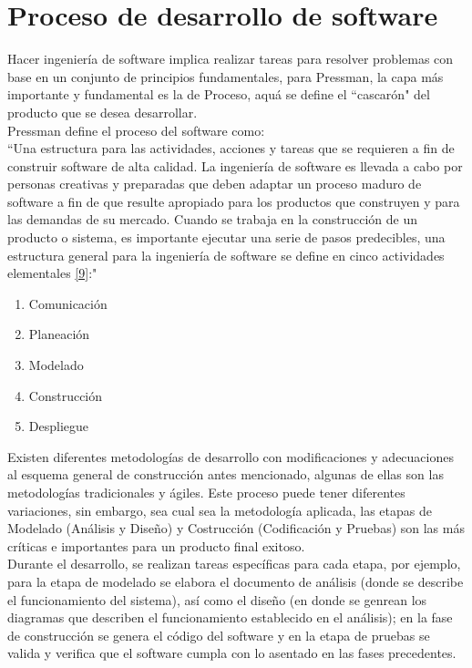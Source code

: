 \newpage

\section{Proceso de desarrollo de software}

Hacer ingeniería de software implica realizar tareas para resolver problemas con base en un conjunto de principios fundamentales, para Pressman, la capa más importante y fundamental es la de Proceso, aquá se define el ``cascarón" del producto que se desea desarrollar.\\

Pressman define el proceso del software como: \\

``Una estructura para las actividades, acciones y tareas que se requieren a fin de construir software de alta calidad. La ingeniería de software es llevada a cabo por personas creativas y preparadas que deben adaptar un proceso maduro de software a fin de que resulte apropiado para los productos que construyen y para las demandas de su mercado.
Cuando se trabaja en la construcción de un producto o sistema, es importante ejecutar una serie de pasos predecibles, una estructura general para la ingeniería de software se define en cinco actividades elementales  \hyperlink{b09}{[9]}:"

\begin{enumerate}
	\item Comunicación
	\item Planeación
	\item Modelado
	\item Construcción
	\item Despliegue
\end{enumerate}

Existen diferentes metodologías de desarrollo con modificaciones y adecuaciones al esquema general de construcción antes mencionado, algunas de ellas son las metodologías tradicionales y ágiles. Este proceso puede tener diferentes variaciones, sin embargo, sea cual sea la metodología aplicada, las etapas de Modelado (Análisis y Diseño) y Costrucción (Codificación y Pruebas) son las más críticas e importantes para un producto final exitoso.\\

Durante el desarrollo, se realizan tareas específicas para cada etapa, por ejemplo, para la etapa de modelado se elabora el documento de análisis (donde se describe el funcionamiento del sistema), así como el diseño (en donde se genrean los diagramas que describen el funcionamiento establecido en el análisis); en la fase de construcción se genera el código del software y en la etapa de pruebas se valida y verifica que el software cumpla con lo asentado en las fases precedentes.

